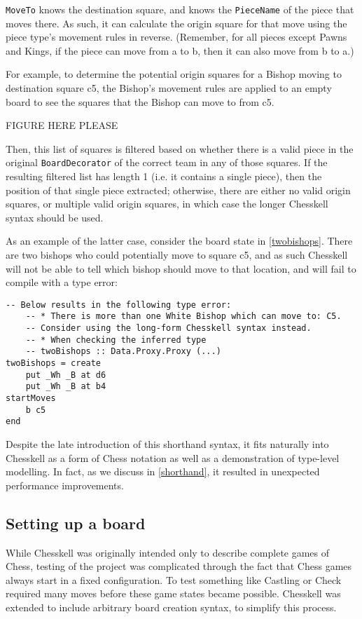 \documentclass[12pt, a4paper, bibliography=totocnumbered]{scrreprt}
\newcommand{\inline}[1]{\lstinline[basicstyle=\ttfamily\footnotesize]{#1}}
\begin{document}
\inline{MoveTo} knows the destination square, and knows the \inline{PieceName} of the piece that moves there. As such, it can calculate the origin square for that move using the piece type's movement rules in reverse. (Remember, for all pieces except Pawns and Kings, if the piece can move from a to b, then it can also move from b to a.)

For example, to determine the potential origin squares for a Bishop moving to destination square c5, the Bishop's movement rules are applied to an empty board to see the squares that the Bishop can move to from c5.

FIGURE HERE PLEASE %

Then, this list of squares is filtered based on whether there is a valid piece in the original \inline{BoardDecorator} of the correct team in any of those squares. If the resulting filtered list has length 1 (i.e. it contains a single piece), then the position of that single piece extracted; otherwise, there are either no valid origin squares, or multiple valid origin squares, in which case the longer Chesskell syntax should be used.

As an example of the latter case, consider the board state in \cref{twobishops}. There are two bishops who could potentially move to square c5, and as such Chesskell will not be able to tell which bishop should move to that location, and will fail to compile with a type error:

\begin{lstlisting}
-- Below results in the following type error:
    -- * There is more than one White Bishop which can move to: C5.
    -- Consider using the long-form Chesskell syntax instead.
    -- * When checking the inferred type
    -- twoBishops :: Data.Proxy.Proxy (...)
twoBishops = create
    put _Wh _B at d6
    put _Wh _B at b4
startMoves
    b c5
end
\end{lstlisting}

Despite the late introduction of this shorthand syntax, it fits naturally into Chesskell as a form of Chess notation as well as a demonstration of type-level modelling. In fact, as we discuss in \cref{shorthand}, it resulted in unexpected performance improvements.

\subsection{Setting up a board}

While Chesskell was originally intended only to describe complete games of Chess, testing of the project was complicated through the fact that Chess games always start in a fixed configuration. To test something like Castling or Check required many moves before these game states became possible. Chesskell was extended to include arbitrary board creation syntax, to simplify this process.
\end{document}
